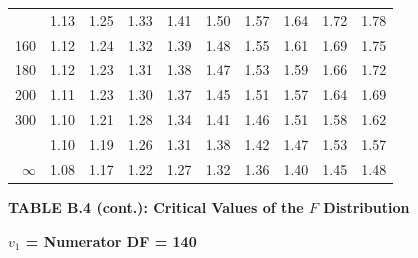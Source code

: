 \documentclass[10pt]{article}
\begin{document}
\begin{longtable}{@{}r!{\vrule width 0.8pt\hspace{0.55em}}rrrrrrrrr@{}}
 & 1.13 & 1.25 & 1.33 & 1.41 & 1.50 & 1.57 & 1.64 & 1.72 & 1.78 \\
160 & 1.12 & 1.24 & 1.32 & 1.39 & 1.48 & 1.55 & 1.61 & 1.69 & 1.75 \\
180 & 1.12 & 1.23 & 1.31 & 1.38 & 1.47 & 1.53 & 1.59 & 1.66 & 1.72 \\
200 & 1.11 & 1.23 & 1.30 & 1.37 & 1.45 & 1.51 & 1.57 & 1.64 & 1.69 \\
300 & 1.10 & 1.21 & 1.28 & 1.34 & 1.41 & 1.46 & 1.51 & 1.58 & 1.62 \\
 & 1.10 & 1.19 & 1.26 & 1.31 & 1.38 & 1.42 & 1.47 & 1.53 & 1.57 \\
$\infty$ & 1.08 & 1.17 & 1.22 & 1.27 & 1.32 & 1.36 & 1.40 & 1.45 & 1.48 \\
\end{longtable}
\newpage
\thispagestyle{empty}
\begin{center}
{\large\bfseries TABLE B.4 (cont.): Critical Values of the $F$ Distribution\par}
\end{center}
{\large\bfseries $v_1$ = Numerator DF = 140\par}
\vspace{0.5em}
\small
\end{document}

